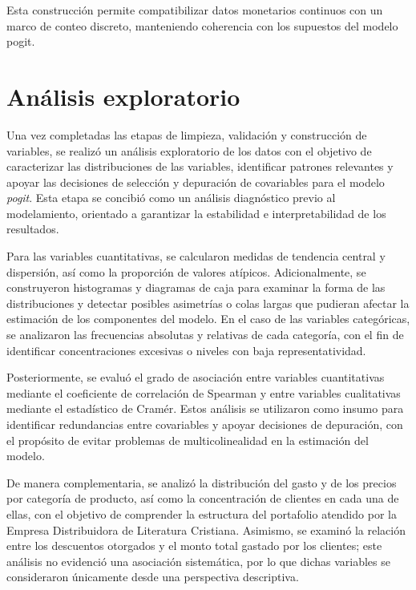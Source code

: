     Esta construcción permite compatibilizar datos monetarios continuos con un marco de conteo discreto, manteniendo coherencia con los supuestos del modelo pogit.

\section{Análisis exploratorio}
    Una vez completadas las etapas de limpieza, validación y construcción de variables, se realizó un análisis exploratorio de los datos con el objetivo de caracterizar las distribuciones de las variables, identificar patrones relevantes y apoyar las decisiones de selección y depuración de covariables para el modelo \emph{pogit}. Esta etapa se concibió como un análisis diagnóstico previo al modelamiento, orientado a garantizar la estabilidad e interpretabilidad de los resultados.
    
    Para las variables cuantitativas, se calcularon medidas de tendencia central y dispersión, así como la proporción de valores atípicos. Adicionalmente, se construyeron histogramas y diagramas de caja para examinar la forma de las distribuciones y detectar posibles asimetrías o colas largas que pudieran afectar la estimación de los componentes del modelo. En el caso de las variables categóricas, se analizaron las frecuencias absolutas y relativas de cada categoría, con el fin de identificar concentraciones excesivas o niveles con baja representatividad.
    
    Posteriormente, se evaluó el grado de asociación entre variables cuantitativas mediante el coeficiente de correlación de Spearman y entre variables cualitativas mediante el estadístico de Cramér. Estos análisis se utilizaron como insumo para identificar redundancias entre covariables y apoyar decisiones de depuración, con el propósito de evitar problemas de multicolinealidad en la estimación del modelo.
    
    De manera complementaria, se analizó la distribución del gasto y de los precios por categoría de producto, así como la concentración de clientes en cada una de ellas, con el objetivo de comprender la estructura del portafolio atendido por la Empresa Distribuidora de Literatura Cristiana. Asimismo, se examinó la relación entre los descuentos otorgados y el monto total gastado por los clientes; este análisis no evidenció una asociación sistemática, por lo que dichas variables se consideraron únicamente desde una perspectiva descriptiva.
    
